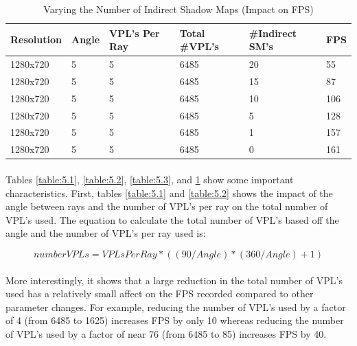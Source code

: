\begin{table}[h!]
	\caption{Varying the Number of Indirect Shadow Maps (Impact on FPS)}
	\begin{center}
	    \begin{tabular}{ | l | l | l | l | l | l |}
	    \hline
	    Resolution & Angle & VPL's Per Ray & Total \#VPL's & \#Indirect SM's & FPS\\ \hline
	    1280x720 & 5 & 5 & 6485 & 20 & 55\\ \hline
	    1280x720 & 5 & 5 & 6485 & 15 & 87\\ \hline
	    1280x720 & 5 & 5 & 6485 & 10 & 106\\ \hline
	    1280x720 & 5 & 5 & 6485 & 5 & 128\\ \hline
	    1280x720 & 5 & 5 & 6485 & 1 & 157\\ \hline
	    1280x720 & 5 & 5 & 6485 & 0 & 161\\ \hline
	    \end{tabular}
	\end{center}
	\label{table:5.4}
\end{table}

\paragraph{}
Tables \ref{table:5.1}, \ref{table:5.2}, \ref{table:5.3}, and \ref{table:5.4} show some important characteristics.  First, tables \ref{table:5.1} and \ref{table:5.2} shows the impact of the angle between rays and the number of VPL's per ray on the total number of VPL's used.  The equation to calculate the total number of VPL's based off the angle and the number of VPL's per ray used is:

\begin{equation}
numberVPLs = VPLsPerRay*((90/Angle)*(360/Angle)+1)
\label{eqn:calcVPLtotal}
\end{equation}

\paragraph{}
More interestingly, it shows that a large reduction in the total number of VPL's used has a relatively small affect on the FPS recorded compared to other parameter changes.  For example, reducing the number of VPL's used by a factor of 4 (from 6485 to 1625) increases FPS by only 10 whereas reducing the number of VPL's used by a factor of near 76 (from 6485 to 85) increases FPS by 40.

